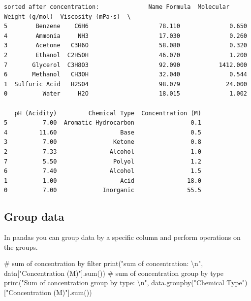 \documentclass[
  letterpaper,
  DIV=11,
  numbers=noendperiod]{scrreprt}
\newenvironment{Shaded}{\begin{snugshade}}{\end{snugshade}}
\newcommand{\BuiltInTok}[1]{\textcolor[rgb]{0.00,0.23,0.31}{#1}}
\newcommand{\CharTok}[1]{\textcolor[rgb]{0.13,0.47,0.30}{#1}}
\newcommand{\CommentTok}[1]{\textcolor[rgb]{0.37,0.37,0.37}{#1}}
\newcommand{\NormalTok}[1]{\textcolor[rgb]{0.00,0.23,0.31}{#1}}
\newcommand{\StringTok}[1]{\textcolor[rgb]{0.13,0.47,0.30}{#1}}
\begin{document}
\begin{verbatim}
sorted after concentration:              Name Formula  Molecular Weight (g/mol)  Viscosity (mPa·s)  \
5        Benzene    C6H6                    78.110              0.650   
4        Ammonia     NH3                    17.030              0.260   
3        Acetone   C3H6O                    58.080              0.320   
2        Ethanol  C2H5OH                    46.070              1.200   
7       Glycerol  C3H8O3                    92.090           1412.000   
6       Methanol   CH3OH                    32.040              0.544   
1  Sulfuric Acid   H2SO4                    98.079             24.000   
0          Water     H2O                    18.015              1.002   

   pH (Acidity)         Chemical Type  Concentration (M)  
5          7.00  Aromatic Hydrocarbon                0.1  
4         11.60                  Base                0.5  
3          7.00                Ketone                0.8  
2          7.33               Alcohol                1.0  
7          5.50                Polyol                1.2  
6          7.40               Alcohol                1.5  
1          1.00                  Acid               18.0  
0          7.00             Inorganic               55.5  
\end{verbatim}

\subsection{Group data}\label{group-data}

In pandas you can group data by a specific column and perform operations
on the groups.

\begin{Shaded}
\begin{Highlighting}[]
\CommentTok{\# sum of concentration by filter}
\BuiltInTok{print}\NormalTok{(}\StringTok{"sum of concentration: }\CharTok{\textbackslash{}n}\StringTok{"}\NormalTok{, data[}\StringTok{"Concentration (M)"}\NormalTok{].}\BuiltInTok{sum}\NormalTok{()) }
\CommentTok{\# sum of concentration group by type}
\BuiltInTok{print}\NormalTok{(}\StringTok{"Sum of concentration group by type: }\CharTok{\textbackslash{}n}\StringTok{"}\NormalTok{, data.groupby(}\StringTok{"Chemical Type"}\NormalTok{)[}\StringTok{"Concentration (M)"}\NormalTok{].}\BuiltInTok{sum}\NormalTok{())}
\end{Highlighting}
\end{Shaded}
\end{document}
